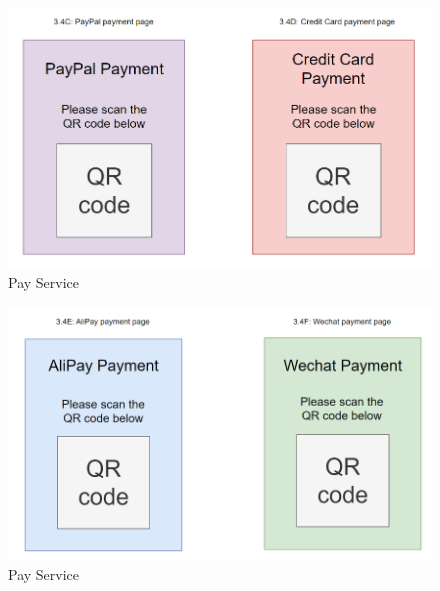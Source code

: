 \documentclass[a4paper,12pt]{article}
\begin{document}
\begin{figure}[H]
    \begin{center}
        \includegraphics[width=\textwidth]{picture/0234.png}
        \caption{Pay Service}
        \label{fig:access-thesis}
    \end{center}
\end{figure}

\begin{figure}[H]
    \begin{center}
        \includegraphics[width=\textwidth]{picture/0345.png}
        \caption{Pay Service}
        \label{fig:access-thesis}
    \end{center}
\end{figure}
\end{document}
